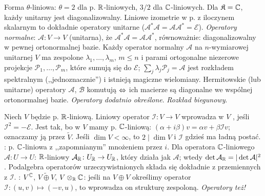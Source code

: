 Forma  $\theta$-liniowa: $\theta = 2$ dla p. $\mathbb{R}$-liniowych, $3/2$ dla $\mathbb{C}$-liniowych.
Dla $\mathfrak K = \mathbb{C}$, każdy unitarny jest diagonalizowalny.
Liniowe izometrie w p. z iloczynem skalarnym to dokładnie operatory unitarne ($\mathcal A^* \mathcal A = \mathcal A \mathcal A^* = \mathcal E$).
\emph{Operatory normalne}: $\mathcal A \colon V \to V$ (unitarna), że $\mathcal A^* \mathcal A = \mathcal A \mathcal A^*$, równoważnie: diagonalizowalny w pewnej ortonormalnej bazie.
Każdy operator normalny $\mathcal A$ na $n$-wymiarowej unitarnej $V$ ma zespolone $\lambda_1, \dots, \lambda_m$, $m \le n$ i parami ortogonalne niezerowe projekcje $\mathcal P_1, \dots, \mathcal P_m$, które sumują się do $\mathcal E$; $\sum_j \lambda_j \mathcal P_j = \mathcal A$ jest rozkładem spektralnym (,,jednoznacznie'') i istnieją magiczne wielomiany.	
Hermitowskie (lub unitarne) operatory $\mathcal A$, $\mathcal B$ komutują $\Leftrightarrow$ ich macierze są diagonalne we wspólnej ortonormalnej bazie.
\emph{Operatory dodatnio określone}.  %
\emph{Rozkład biegunowy}.  %

Niech  $V$ będzie p. $\mathbb{R}$-liniową.
Liniowy operator $\mathcal I \colon V \to V$ wprowadza w $V$ , jeśli $\mathcal I^2 = - \mathcal E$.
Jest tak, bo w $V$ mamy p. $\mathbb{C}$-liniową: $(\alpha + i \beta) v = \alpha v  + \beta \mathcal I v$; oznaczamy ją przez $\widetilde{V}$.
Jeśli $\dim V < \infty$, to $2 \mid \dim V$ i $\mathcal I$ gdzieś ma ładną postać.
: p. $\mathbb{C}$-liniowa z ,,zapomnianym'' mnożeniem przez $i$.
Dla operatora $\mathbb{C}$-liniowego $\mathcal A \colon U \to U$: $\mathbb{R}$-liniowy $\mathcal A_{\mathbb{R}} \colon U_{\mathbb{R}} \to U_{\mathbb{R}}$, który działa jak $\mathcal A$; wtedy $\det \mathcal A_{\mathbb{R}} = |\det \mathcal A|^2$.
Podalgebra operatorów urzeczywistnionych składa się dokładnie z przemiennych z $\mathcal I$.
: $V^{\mathbb{C}}$, $V \widetilde{\oplus} V$, $V \otimes_{\mathbb{R}} \mathbb{C}$: jeśli na $V \oplus V$ określimy operator $\mathcal I \colon (u,v) \mapsto (-v,u)$, to wprowadza on  strukturę zespoloną.
\emph{Operatory też!}
